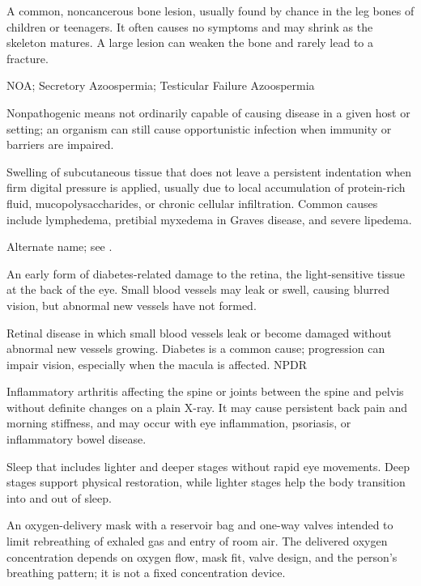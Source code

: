  A common, noncancerous bone lesion,
  usually found by chance in the leg bones of children or teenagers. It
  often causes no symptoms and may shrink as the skeleton matures. A
  large lesion can weaken the bone and rarely lead to a fracture.

\synonyms
NOA; Secretory Azoospermia; Testicular Failure Azoospermia

 Nonpathogenic means not ordinarily capable of causing disease in a given host or setting; an organism can still cause opportunistic infection when immunity or barriers are impaired.

 Swelling of subcutaneous tissue that does not leave a persistent indentation when firm digital pressure is applied, usually due to local accumulation of protein-rich fluid, mucopolysaccharides, or chronic cellular infiltration. Common causes include lymphedema, pretibial myxedema in Graves disease, and severe lipedema.

 Alternate name; see .

 An early form of diabetes-related damage to the retina, the light-sensitive tissue at the back of the eye. Small blood vessels may leak or swell, causing blurred vision, but abnormal new vessels have not formed.

 Retinal disease in which small blood vessels leak or become damaged without abnormal new vessels growing. Diabetes is a common cause; progression can impair vision, especially when the macula is affected.
\synonyms
NPDR

 Inflammatory arthritis affecting the spine or joints between the spine and pelvis without definite changes on a plain X-ray. It may cause persistent back pain and morning stiffness, and may occur with eye inflammation, psoriasis, or inflammatory bowel disease.

 Sleep that includes lighter and deeper stages without rapid eye movements. Deep stages support physical restoration, while lighter stages help the body transition into and out of sleep.

 An oxygen-delivery mask with a reservoir bag and one-way valves intended to limit rebreathing of exhaled gas and entry of room air. The delivered oxygen concentration depends on oxygen flow, mask fit, valve design, and the person's breathing pattern; it is not a fixed concentration device.

